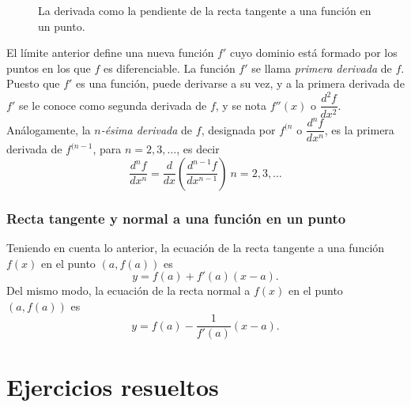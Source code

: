 \begin{figure}[h!]
\begin{center}
\scalebox{1}{}
\caption{La derivada como la pendiente de la
recta tangente a una función en un punto.}
\label{g:tangente}
\end{center}
\end{figure}


El límite anterior define una nueva función $f'$ cuyo dominio está formado por los
puntos en los que $f$ es diferenciable. La función $f'$ se llama \emph{primera
derivada} de $f$. Puesto que $f'$ es una función, puede derivarse a su vez, y a
la primera derivada de $f'$ se le conoce como segunda derivada de $f$, y se
nota $f''(x)$ o $\dfrac{d^2f}{dx^2}$. Análogamente, la \emph{$n$-ésima
derivada} de $f$, designada por $f^{(n}$ o $\dfrac{d^nf}{dx^n}$, es la primera
derivada de $f^{(n-1}$, para $n=2,3,\ldots$, es decir
\[
\frac{d^nf}{dx^n}=\frac{d}{dx}\left(\frac{d^{n-1}f}{dx^{n-1}}\right)\
n=2,3,\ldots
\]

\subsubsection*{Recta tangente y normal a una función en un punto}
Teniendo en cuenta lo anterior, la ecuación de la recta tangente a una función
$f(x)$ en el punto $(a,f(a))$ es
\[
y=f(a)+f'(a)(x-a).
\]
Del mismo modo, la ecuación de la recta normal a $f(x)$ en el punto $(a,f(a))$
es
\[
y=f(a)-\frac{1}{f'(a)}(x-a).
\]


\section{Ejercicios resueltos}


